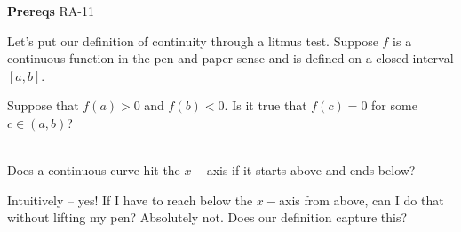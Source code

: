 

\textbf{Prereqs} RA-11

Let's put our definition of continuity through a litmus test. Suppose $f$ is a continuous function in the pen and paper sense and is defined on a closed interval $[a, b]$.

Suppose that $f(a) > 0$ and $f(b) < 0$. Is it true that $f(c) = 0$ for some $c \in (a, b)$?
\begin{center}
\\
Does a continuous curve hit the $x-$axis if it starts above and ends below?
\end{center}
Intuitively -- yes! If I have to reach below the $x-$axis from above, can I do that without lifting my pen? Absolutely not. Does our definition capture this?

